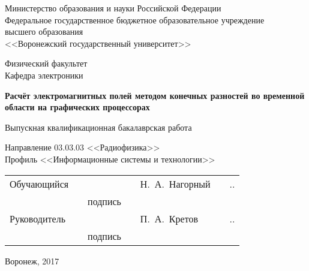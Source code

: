 \begin{titlepage}

\centering
Министерство образования и науки Российской Федерации\\
Федеральное государственное бюджетное образовательное учреждение\\
высшего образования\\
<<Воронежский государственный университет>>\\

\vspace{20mm}

Физический факультет\\
Кафедра электроники

\vspace{35mm}

\textbf{
    Расчёт электромагнитных полей методом конечных разностей во временной области на графических процессорах}

\vspace{15mm}

Выпускная квалификационная бакалаврская работа\\

\vspace{10mm}

Направление 03.03.03 <<Радиофизика>>\\
Профиль <<Информационные системы и технологии>>\\

\vspace{20mm}

\begin{tabularx}{\textwidth}{llcllll}
Обучающийся & \hspace{10mm} & \underline{\hspace{15mm}} & \hspace{10mm} & Н.~А.~Нагорный & \hspace{10mm} & \underline{\hspace{5mm}}.\underline{\hspace{5mm}}.\underline{\hspace{10mm}} \\
&& {\footnotesize подпись} &&&& \\
Руководитель & \hspace{10mm} & \underline{\hspace{15mm}} & \hspace{10mm} & П.~А.~Кретов & \hspace{10mm} & \underline{\hspace{5mm}}.\underline{\hspace{5mm}}.\underline{\hspace{10mm}} \\
&& {\footnotesize подпись} &&&& \\

\end{tabularx}

\vspace*{\fill}

Воронеж, 2017

\end{titlepage}

\setcounter{page}{2}